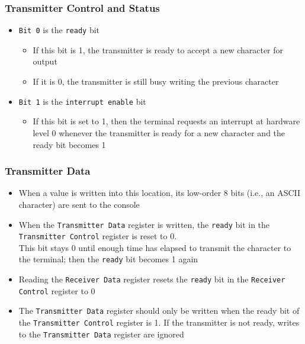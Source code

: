 \documentclass{beamer}
\begin{document}
\begin{frame}%
  \frametitle{Transmitter Control and Status}

  \begin{itemize}
  \item \texttt{Bit 0} is the \texttt{ready} bit
    \begin{itemize}
    \item If this bit is 1, the transmitter is ready to accept a new character for output
    \item If it is 0, the transmitter is still busy writing the previous character
    \end{itemize}
    \vspace{0.4cm}
  \item \texttt{Bit 1} is the \texttt{interrupt enable} bit
    \begin{itemize}
    \item If this bit is set to 1, then the terminal requests an interrupt at hardware level 0 whenever the transmitter
      is ready for a new character and the ready bit becomes 1
    \end{itemize}
  \end{itemize}

\end{frame}

\begin{frame}%
  \frametitle{Transmitter Data}

  \begin{itemize}
  \item When a value is written into this location, its low-order 8 bits (i.e., an ASCII character) are sent to the console

  \item When the \texttt{Transmitter Data} register is written, the \texttt{ready} bit in the \texttt{Transmitter Control} register is reset to 0.\\
    This bit stays 0 until enough time has elapsed to transmit the character to the terminal; then the \texttt{ready} bit becomes 1 again

  \item Reading the \texttt{Receiver Data} register resets the \texttt{ready} bit in the \texttt{Receiver Control} register to 0

  \item The \texttt{Transmitter Data} register should only be written when the ready bit of the
    \texttt{Transmitter Control} register is 1. If the transmitter is not ready, writes to the \texttt{Transmitter Data} register are ignored
  \end{itemize}

\end{frame}
\end{document}
